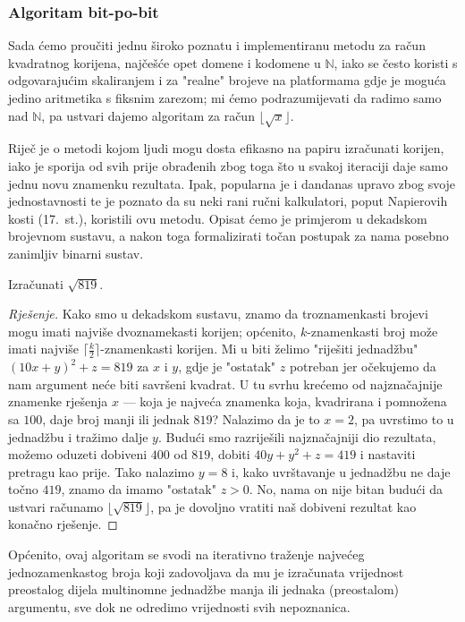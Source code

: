 \documentclass[12pt]{scrartcl}
\newcommand{\primjer}[2]{%
    \renewcommand\qedsymbol{$\vartriangleleft$}%
    \begin{example}%
        #1%
    \end{example}%
    \begin{proof}[Rješenje]%
        #2%
    \end{proof}%
    \renewcommand\qedsymbol{$\square$}
}
\begin{document}
\subsubsection{Algoritam bit-po-bit}
Sada ćemo proučiti jednu široko poznatu i implementiranu metodu za račun kvadratnog korijena, najčešće opet domene i kodomene u
$\mathbb{N}$, iako se često koristi s odgovarajućim skaliranjem i za "realne" brojeve
 na platformama gdje je moguća jedino aritmetika s fiksnim zarezom; mi ćemo podrazumijevati da radimo samo nad $\mathbb N$, pa ustvari
 dajemo algoritam za račun $\lfloor\sqrt x\rfloor$.

Riječ je o metodi kojom ljudi mogu dosta efikasno na papiru izračunati korijen, iako je sporija od svih prije obrađenih zbog toga
što u svakoj iteraciji daje samo jednu novu znamenku rezultata. Ipak, popularna je i dandanas upravo zbog svoje jednostavnosti te je
poznato da su neki rani ručni kalkulatori, poput Napierovih kosti (17.\ st.), koristili ovu metodu.
 Opisat ćemo je primjerom
u dekadskom brojevnom sustavu, a nakon toga formalizirati točan postupak za nama posebno zanimljiv binarni sustav.

\primjer{Izračunati $\sqrt{819}$.}
{Kako smo u dekadskom sustavu, znamo da troznamenkasti brojevi mogu imati najviše dvoznamekasti korijen; općenito, $k$-znamenkasti broj
može imati najviše $\lceil\frac{k}{2}\rceil$-znamenkasti korijen. Mi u biti želimo "riješiti jednadžbu" $(10x+y)^2+z=819$ za $x$ i $y$, gdje je 
"ostatak" $z$ potreban jer očekujemo da nam argument neće biti savršeni kvadrat. U tu svrhu krećemo od najznačajnije znamenke rješenja
$x$ --- koja je najveća znamenka koja, kvadrirana i pomnožena sa $100$, daje broj manji ili jednak $819$? Nalazimo da je to $x=2$, pa
uvrstimo to u jednadžbu i tražimo dalje $y$. Budući smo razriješili najznačajniji dio rezultata, možemo oduzeti dobiveni $400$ od $819$,
dobiti $40y+y^2+z=419$
i nastaviti pretragu kao prije. Tako nalazimo $y=8$ i, kako uvrštavanje u jednadžbu ne daje točno $419$,
znamo da imamo "ostatak" $z>0$. No, nama on nije bitan budući da ustvari računamo $\lfloor\sqrt{819}\rfloor$, pa je
 dovoljno vratiti naš dobiveni rezultat kao konačno rješenje.}

Općenito, ovaj algoritam se svodi na iterativno traženje najvećeg jednozamenkastog
broja koji zadovoljava da mu je izračunata vrijednost preostalog dijela multinomne jednadžbe manja ili jednaka (preostalom) argumentu, sve
dok ne odredimo vrijednosti svih nepoznanica.
\end{document}

